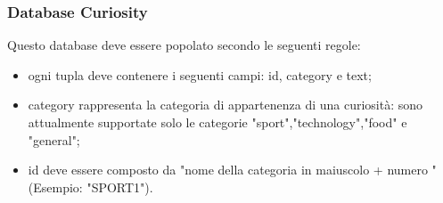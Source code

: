 \subsubsection{Database Curiosity}
Questo database deve essere popolato secondo le seguenti regole:
\begin{itemize}
\item ogni tupla deve contenere i seguenti campi: id, category e text;
\item category rappresenta la categoria di appartenenza di una curiosità: sono attualmente supportate solo le categorie "sport","technology","food" e "general";
\item id deve essere composto da "nome della categoria in maiuscolo + numero "(Esempio: "SPORT1").
\end{itemize}

\newpage

